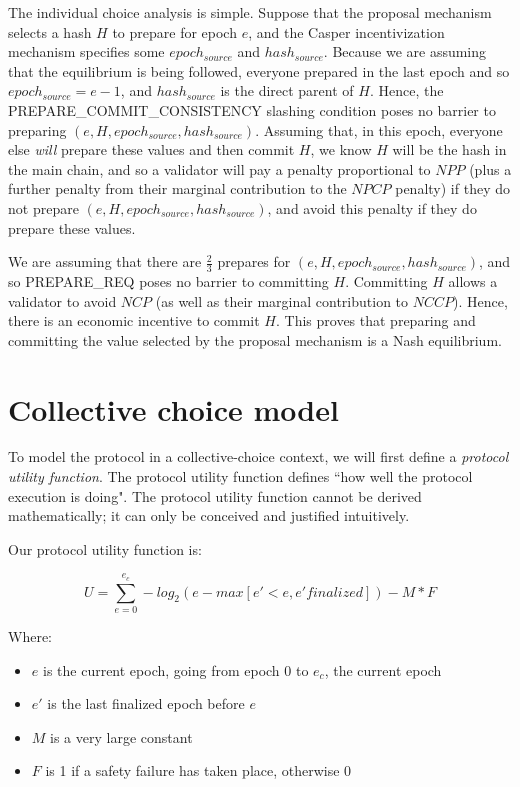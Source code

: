\documentclass[12pt]{article}
\begin{document}
The individual choice analysis is simple. Suppose that the proposal mechanism selects a hash $H$ to prepare for epoch $e$, and the Casper incentivization mechanism specifies some $epoch_{source}$ and $hash_{source}$. Because we are assuming that the equilibrium is being followed, everyone prepared in the last epoch and so $epoch_{source} = e - 1$, and $hash_{source}$ is the direct parent of $H$. Hence, the PREPARE\_COMMIT\_CONSISTENCY slashing condition poses no barrier to preparing $(e, H, epoch_{source}, hash_{source})$. Assuming that, in this epoch, everyone else \textit{will} prepare these values and then commit $H$, we know $H$ will be the hash in the main chain, and so a validator will pay a penalty proportional to $NPP$ (plus a further penalty from their marginal contribution to the $NPCP$ penalty) if they do not prepare $(e, H, epoch_{source}, hash_{source})$, and avoid this penalty if they do prepare these values.

We are assuming that there are $\frac{2}{3}$ prepares for $(e, H, epoch_{source}, hash_{source})$, and so PREPARE\_REQ poses no barrier to committing $H$. Committing $H$ allows a validator to avoid $NCP$ (as well as their marginal contribution to $NCCP$). Hence, there is an economic incentive to commit $H$. This proves that preparing and committing the value selected by the proposal mechanism is a Nash equilibrium.

\section{Collective choice model}

To model the protocol in a collective-choice context, we will first define a \textit{protocol utility function}. The protocol utility function defines ``how well the protocol execution is doing". The protocol utility function cannot be derived mathematically; it can only be conceived and justified intuitively.

Our protocol utility function is:

$$U = \sum_{e = 0}^{e_c} -log_2(e - max[e' < e, e' finalized]) - M * F$$

Where:

\begin{itemize}
\item $e$ is the current epoch, going from epoch $0$ to $e_c$, the current epoch
\item $e'$ is the last finalized epoch before $e$
\item $M$ is a very large constant
\item $F$ is 1 if a safety failure has taken place, otherwise 0
\end{itemize}
\end{document}
